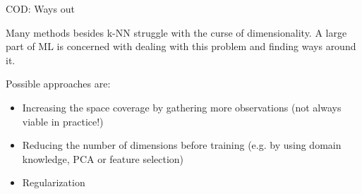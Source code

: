 \begin{vbframe}{COD: Ways out}

Many methods besides k-NN struggle with the curse of dimensionality. A large part of ML is concerned with dealing with this problem and finding ways around it.

\medskip

Possible approaches are:
\begin{itemize}
\item Increasing the space coverage by gathering more observations (not always viable in practice!)
\item Reducing the number of dimensions before training (e.g. by using domain knowledge, PCA or feature selection)
\item Regularization
\end{itemize}


\end{vbframe}


\endlecture
